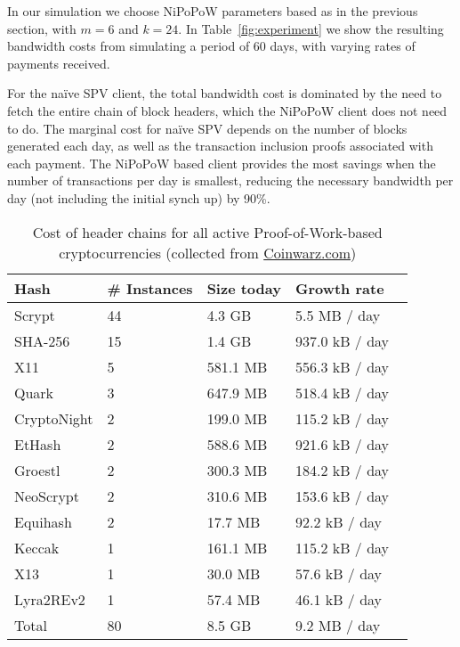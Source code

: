  In our simulation we choose NiPoPoW parameters based as in the previous section, with $m=6$ and $k=24$.
In Table~\ref{fig:experiment} we show the resulting bandwidth costs from simulating a period of 60 days, with varying rates of payments received.

 For the na\"ive SPV client, the total bandwidth cost is dominated by the need to fetch the entire chain of block headers, which the NiPoPoW client does not need to do. The marginal cost for na\"ive SPV depends on the number of blocks generated each day, as well as the transaction inclusion proofs associated with each payment. The NiPoPoW based client provides the most savings when the number of transactions per day is smallest, reducing the necessary bandwidth per day (not including the initial synch up) by 90\%.

\begin{table}
  \caption{Cost of header chains for all active Proof-of-Work-based cryptocurrencies (collected from \url{Coinwarz.com})}
  \label{tbl:currencies}
\small
  \begin{tabular}{l|l|l|l}
    {\bf Hash} & {\bf \# Instances} & {\bf Size today} & {\bf Growth rate}  \\
    \hline
    Scrypt  & 44  & 4.3 GB  & 5.5 MB / day \  \\
    SHA-256  & 15  & 1.4 GB  & 937.0 kB / day \  \\
    X11  & 5  & 581.1 MB  & 556.3 kB / day \  \\
    Quark  & 3  & 647.9 MB  & 518.4 kB / day \  \\
    CryptoNight  & 2  & 199.0 MB  & 115.2 kB / day \  \\
    EtHash  & 2  & 588.6 MB  & 921.6 kB / day \  \\
    Groestl  & 2  & 300.3 MB  & 184.2 kB / day \  \\
    NeoScrypt  & 2  & 310.6 MB  & 153.6 kB / day \  \\
    Equihash  & 2  & 17.7 MB  & 92.2 kB / day \  \\
    Keccak  & 1  & 161.1 MB  & 115.2 kB / day \  \\
    X13  & 1  & 30.0 MB  & 57.6 kB / day \  \\
    Lyra2REv2  & 1  & 57.4 MB  & 46.1 kB / day \  \\
    \hline
    Total  & 80   &  8.5 GB  & 9.2 MB  / day  \\
  \end{tabular}
\end{table}



